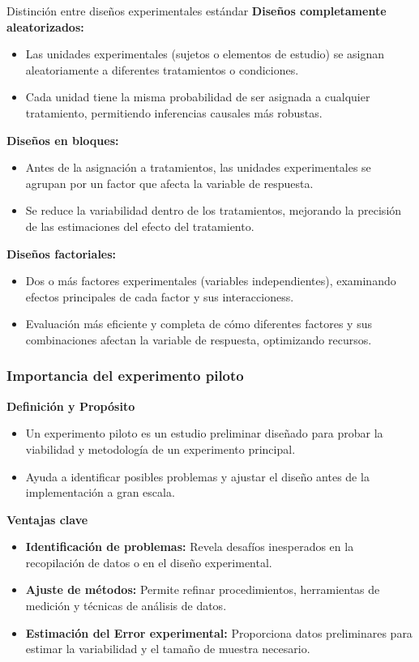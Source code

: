 ﻿\documentclass{beamer}
\begin{document}
\begin{frame}{Distinción entre diseños experimentales estándar}
    \textbf{Diseños completamente aleatorizados:}
    \begin{itemize}
        \item Las unidades experimentales (sujetos o elementos de estudio) se asignan aleatoriamente a diferentes tratamientos o condiciones. 
        \item Cada unidad tiene la misma probabilidad de ser asignada a cualquier tratamiento, permitiendo inferencias causales más robustas.
    \end{itemize}

    \textbf{Diseños en bloques:}
    \begin{itemize}
        \item Antes de la asignación a tratamientos, las unidades experimentales se agrupan  por un factor que afecta la variable de respuesta.
        \item Se reduce la variabilidad dentro de los tratamientos, mejorando la precisión de las estimaciones del efecto del tratamiento.
    \end{itemize}

    \textbf{Diseños factoriales:}
    \begin{itemize}
        \item Dos o más factores experimentales (variables independientes), examinando efectos principales de cada factor y sus interaccioness.
        \item Evaluación más eficiente y completa de cómo diferentes factores y sus combinaciones afectan la variable de respuesta, optimizando recursos.
    \end{itemize}
\end{frame}

\begin{frame}
\frametitle{Importancia del experimento piloto}
\textbf{Definición y Propósito}

\begin{itemize}
    \item Un experimento piloto es un estudio preliminar diseñado para probar la viabilidad y metodología de un experimento principal.
    \item Ayuda a identificar posibles problemas y ajustar el diseño antes de la implementación a gran escala.
\end{itemize}

\textbf{Ventajas clave}

\begin{itemize}
    \item \textbf{Identificación de problemas:} Revela desafíos inesperados en la recopilación de datos o en el diseño experimental.
    \item \textbf{Ajuste de métodos:} Permite refinar procedimientos, herramientas de medición y técnicas de análisis de datos.
    \item \textbf{Estimación del Error experimental:} Proporciona datos preliminares para estimar la variabilidad y el tamaño de muestra necesario.
\end{itemize}
\end{frame}
\end{document}
